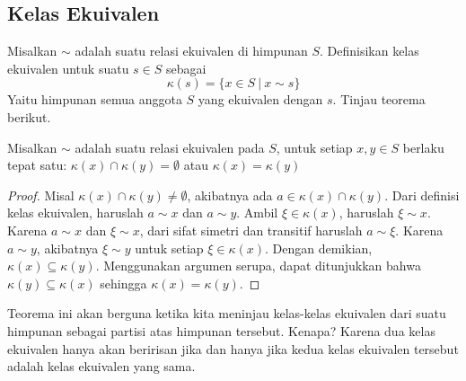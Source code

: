 	\subsection{Kelas Ekuivalen}
	Misalkan $\sim$ adalah suatu relasi ekuivalen di himpunan $S$. Definisikan kelas ekuivalen untuk suatu $s \in S$ sebagai 
	$$\kappa(s) = \{ x \in S \ | \ x \sim s \}$$
	Yaitu himpunan semua anggota $S$ yang ekuivalen dengan $s$. Tinjau teorema berikut.
	
	\begin{theorem}
		\label{kardKlasEq}
		Misalkan $\sim$ adalah suatu relasi ekuivalen pada $S$, untuk setiap $x,y \in S$ berlaku tepat satu:
		$\kappa(x) \cap \kappa(y) = \emptyset$ atau
		$\kappa(x) = \kappa(y)$
	\end{theorem}
	\begin{proof}
		Misal $\kappa(x)\cap\kappa(y) \ne \emptyset$, akibatnya ada $a \in \kappa(x)\cap\kappa(y)$. Dari definisi kelas ekuivalen, haruslah $a \sim x$ dan $a \sim y$. Ambil $\xi \in \kappa(x)$, haruslah $\xi \sim x$. Karena $a \sim x$ dan $\xi \sim x$, dari sifat simetri dan transitif haruslah $a \sim \xi$. Karena $a \sim y$, akibatnya $\xi \sim y$ untuk setiap $\xi \in \kappa(x)$. Dengan demikian, $\kappa(x) \subseteq \kappa(y)$. Menggunakan argumen serupa, dapat ditunjukkan bahwa $\kappa(y) \subseteq \kappa(x)$ sehingga $\kappa(x) = \kappa(y)$.
	\end{proof}
	Teorema ini akan berguna ketika kita meninjau kelas-kelas ekuivalen dari suatu himpunan sebagai partisi atas himpunan tersebut. Kenapa? Karena dua kelas ekuivalen hanya akan beririsan jika dan hanya jika kedua kelas ekuivalen tersebut adalah kelas ekuivalen yang sama.
	\\
	
